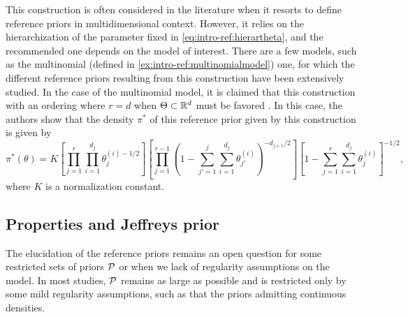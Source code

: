 This construction is often considered in the literature when it resorts to define reference priors in multidimensional context. 
However, it relies on the hierarchization of the parameter fixed in \cref{eq:intro-ref:hierartheta}, and the recommended  one depends on the model of interest.
There are a few models, such as the multinomial (defined in \cref{ex:intro-ref:multinomialmodel}) one, for which the different reference priors resulting from this construction have been extensively studied. In the case of the multinomial model, it is claimed that this construction with an ordering where $r=d$ when $\Theta\subset\mathbb{R}^d$ must be favored  \citep{berger_ordered_1992,berger_overall_2015}.
{In this case, the authors show that the density $\pi^\ast$ of this reference prior given by this construction is given by
    \begin{equation}\label{eq:intro-ref:multinomialhierarref}
        \pi^\ast(\theta) = K \left[\prod_{j=1}^r\prod_{i=1}^{d_j}\theta_j^{(i)-1/2} \right] \left[\prod_{j=1}^{r-1} \left(1- \sum_{j'=1}^j\sum_{i=1}^{d_j}\theta_{j'}^{(i)}   \right)^{-d_{j+1}/2}  \right] \left[1- \sum_{j=1}^r\sum_{i=1}^{d_j}\theta_j^{(i)} \right]^{-1/2},
    \end{equation}
where $K$ is a normalization constant.}





\subsection{Properties and Jeffreys prior}\label{sec:intro-ref:properties}







The elucidation of the reference priors remains an open question for some restricted sets of priors $\mathcal{P}$ or when we lack of regularity assumptions on the model.
In most studies, $\mathcal{P}$ remains as large as possible and is restricted only by some mild regularity assumptions, such as that the priors admitting continuous densities.
    
